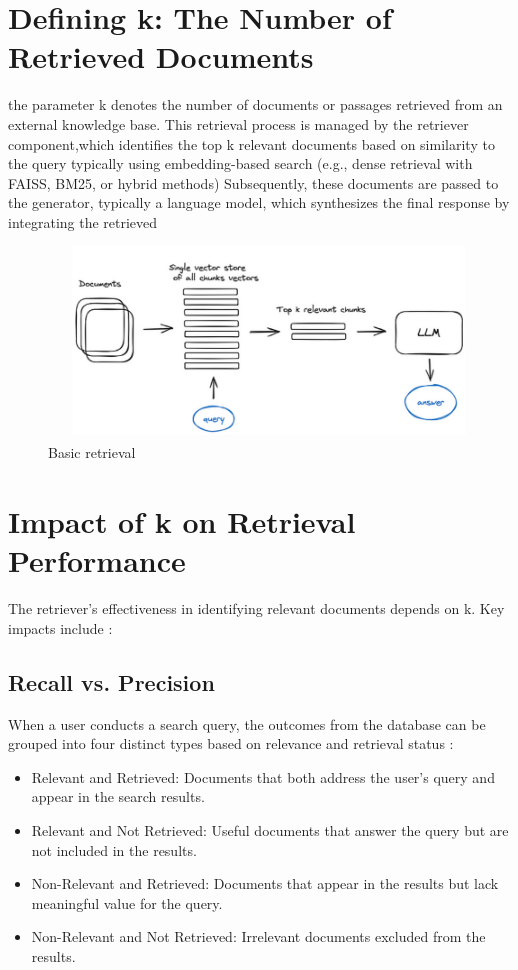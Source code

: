\section{Defining k: The Number of Retrieved Documents}
the parameter k denotes the number of documents or passages retrieved from an external knowledge base. This retrieval process is managed by the retriever component\cite{pareto2024rag},which identifies the top k relevant documents based on similarity to the query typically using embedding-based search\cite{Rossi_2024} (e.g., dense retrieval with FAISS, BM25, or hybrid methods) Subsequently, these documents are passed to the generator, typically a language model, which synthesizes the final response by integrating the retrieved 
\begin{figure}[h]
	\centering
	\includegraphics[width=0.9\linewidth]{Figures/topk.png}
	\caption{Basic retrieval}
	\label{rag_retrival.png}
	
\end{figure}
\newline
\section{Impact of k on Retrieval Performance}
The retriever's effectiveness in identifying relevant documents depends on k. Key impacts include :
\subsection{Recall vs. Precision} 
When a user conducts a search query, the outcomes from the database can be grouped into four distinct types based on relevance and retrieval status \cite{geeksforgeeks2022precision}:
\begin{itemize}
	\item {Relevant and Retrieved:} Documents that both address the user’s query and appear in the search results.
	\item {Relevant and Not Retrieved:} Useful documents that answer the query but are not included in the results.
	
	\item {Non-Relevant and Retrieved:} Documents that appear in the results but lack meaningful value for the query.
	 
	\item {Non-Relevant and Not Retrieved:} Irrelevant documents excluded from the results.
\end{itemize}



